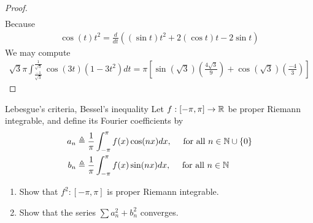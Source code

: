 \documentclass{report}
\begin{document}
\begin{proof}
\begin{align*}
\end{align*}
Because 
\begin{align*}
\cos (t)t^2 = \frac{d}{dt}\left( (\sin t) t^2 + 2 (\cos t)t - 2 \sin t \right)
\end{align*}
We may compute 
\begin{align*}
 \sqrt{3} \pi  \int^{\frac{1}{\sqrt{3} }}_{\frac{-1}{\sqrt{3} }} \cos (3t) (1-3t^2) dt = \pi  \left[\sin (\sqrt{3} ) \left(\frac{4\sqrt{3} }{9} \right)+\cos (\sqrt{3} )\left(\frac{-4}{3} \right) \right]
\end{align*}
\end{proof}
\begin{question}{Lebesgue's criteria, Bessel's inequality}{}
Let $f:[-\pi ,\pi ]\rightarrow \mathbb{R}$ be proper Riemann integrable, and define its Fourier coefficients by 
\begin{align*}
  a_n&\triangleq \frac{1}{\pi }\int_{-\pi }^{\pi } f(x)\cos (nx)dx,\quad \text{ for all }n \in \mathbb{N} \cup  \left\{ 0 \right\} \\
  b_n &\triangleq \frac{1}{\pi }\int_{-\pi }^{\pi }f(x)\sin (nx)dx,\quad \text{ for all }n\in\mathbb{N}
\end{align*}
\begin{enumerate}[label=(\roman*)]
  \item Show that $f^2:[-\pi ,\pi ]$ is proper Riemann integrable. 
  \item Show that the series $\sum a_n^2 +b_n^2$ converges. 
\end{enumerate}
\end{question}
\end{document}
